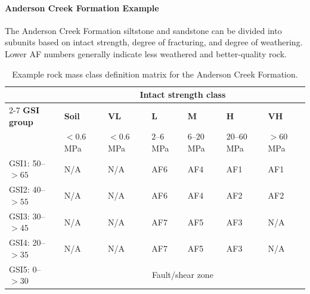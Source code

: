 \paragraph{Anderson Creek Formation Example}
The Anderson Creek Formation siltstone and sandstone can be divided into subunits based on intact strength, degree of fracturing, and degree of weathering. Lower AF numbers generally indicate less weathered and better-quality rock.

\begin{table}[H]
\centering
\footnotesize
\begin{tabularx}{\textwidth}{l X X X X X X}
\toprule
 & \multicolumn{6}{c}{\textbf{Intact strength class}} \\
\cmidrule(lr){2-7}
\textbf{GSI group} & \textbf{Soil} & \textbf{VL} & \textbf{L} & \textbf{M} & \textbf{H} & \textbf{VH} \\
 & $<0.6$ MPa & $<0.6$ MPa & $2$--$6$ MPa & $6$--$20$ MPa & $20$--$60$ MPa & $>60$ MPa \\
\midrule
GSI1: 50--$>65$ & N/A & N/A & AF6 & AF4 & AF1 & AF1 \\
GSI2: 40--$>55$ & N/A & N/A & AF6 & AF4 & AF2 & AF2 \\
GSI3: 30--$>45$ & N/A & N/A & AF7 & AF5 & AF3 & N/A \\
GSI4: 20--$>35$ & N/A & N/A & AF7 & AF5 & AF3 & N/A \\
GSI5: 0--$>30$ & \multicolumn{6}{c}{Fault/shear zone} \\
\bottomrule
\end{tabularx}
\caption{Example rock mass class definition matrix for the Anderson Creek Formation.}
\end{table}

